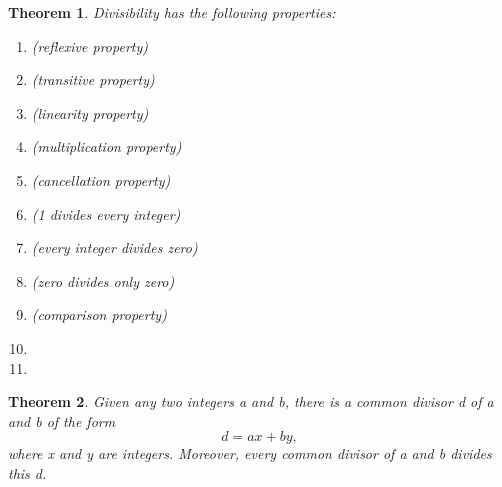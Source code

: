 \documentclass[11pt]{article}
\newtheorem{theorem}{Theorem}
\theoremstyle{definition}
\begin{document}
\begin{theorem}
  Divisibility has the following properties:

  \begin{enumerate}
  \item {} (reflexive property)
  \item {} (transitive property)
  \item {} (linearity property)
  \item {} (multiplication property)
  \item {} (cancellation property)
  \item {} (1 divides every integer)
  \item {} (every integer divides zero)
  \item {} (zero divides only zero)
  \item {} (comparison property)
  \item {}
    \item {}
  \end{enumerate}
\end{theorem}

\begin{theorem}
  Given any two integers a and b, there is a common divisor d of a and b of the form
  \[
d = ax + by,
\]
where x and y are integers. Moreover, every common divisor of a and b divides this d.
\end{theorem}
\end{document}
